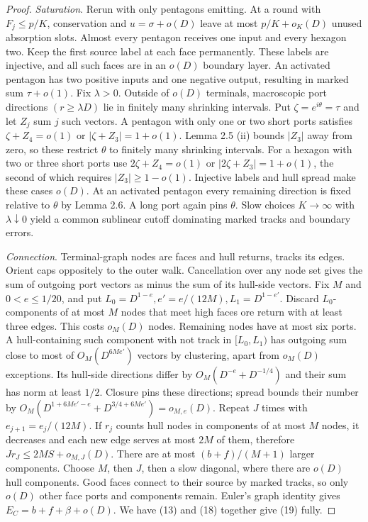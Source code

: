 \documentclass[10pt,reqno]{amsart}
\begin{document}
\begin{proof}
    \textit{Saturation}. Rerun with only pentagons emitting. At a round with $F_j \le p / K$, conservation and $u = \sigma + o(D)$ leave at most $p / K + o_K (D)$ unused absorption slots. Almost every pentagon receives one input and every hexagon two. Keep the first source label at each face permanently. These labels are injective, and all such faces are in an $o(D)$ boundary layer. An activated pentagon has two positive inputs and one negative output, resulting in marked sum $\tau + o(1)$. Fix $\lambda > 0$. Outside of $o(D)$ terminals, macroscopic port directions $(r \ge \lambda D)$ lie in finitely many shrinking intervals. Put $\zeta = e^{i \theta} = \tau$ and let $Z_j$ sum $j$ such vectors. A pentagon with only one or two short ports satisfies $\zeta + Z_4 = o(1)$ or $| \zeta + Z_3| = 1 + o(1)$. Lemma 2.5 (ii) bounds $|Z_3|$ away from zero, so these restrict $\theta$ to finitely many shrinking intervals. For a hexagon with two or three short ports use $2 \zeta + Z_4 = o(1)$ or $|2\zeta + Z_3| = 1 + o(1)$, the second of which requires $|Z_3| \ge 1 - o(1)$. Injective labels and hull spread make these cases $o(D)$. At an activated pentagon every remaining direction is fixed relative to $\theta$ by Lemma 2.6. A long port again pins $\theta$. Slow choices $K \to \infty$ with $\lambda \downarrow 0$ yield a common sublinear cutoff dominating marked tracks and boundary errors.

    \textit{Connection}. Terminal-graph nodes are faces and hull returns, tracks its edges. Orient caps oppositely to the outer walk. Cancellation over any node set gives the sum of outgoing port vectors as minus the sum of its hull-side vectors. Fix $M$ and $0 < e \le 1 / 20$, and put $L_0 = D^{1 - e}, e' = e / (12M), L_1 = D^{1 - e'}$. Discard $L_0$-components of at most $M$ nodes that meet high faces ore return with at least three edges. This costs $o_M (D)$ nodes. Remaining nodes have at most six ports. A hull-containing such component with not track in $[L_0, L_1)$ has outgoing sum close to most of $O_M (D^{6Me'})$ vectors by clustering, apart from $o_M (D)$ exceptions. Its hull-side directions differ by $O_M (D^{-e} + D^{-1/4})$ and their sum has norm at least $1/2$. Closure pins these directions; spread bounds their number by $O_M (D^{1 + 6Me' - e} + D^{3/4 + 6Me'}) = o_{M, e} (D)$. Repeat $J$ times with $e_{j+1} = e_j / (12M)$. If $r_j$ counts hull nodes in components of at most $M$ nodes, it decreases and each new edge serves at most $2M$ of them, therefore $Jr_J \le 2MS + o_{M, J}(D)$. There are at most $(b + f) / (M + 1)$ larger components. Choose $M$, then $J$, then a slow diagonal, where there are $o(D)$ hull components. Good faces connect to their source by marked tracks, so only $o(D)$ other face ports and components remain. Euler's graph identity gives $E_C = b + f + \beta + o(D)$. We have (13) and (18) together give (19) fully.


\end{proof}
\end{document}
